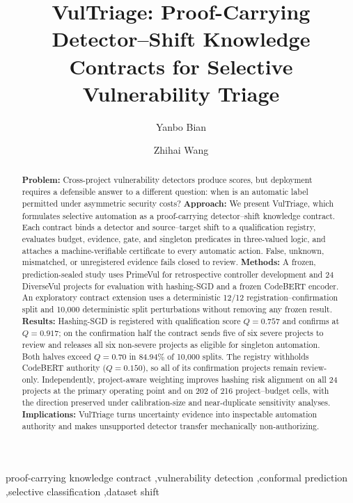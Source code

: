 \documentclass[preprint,12pt]{elsarticle}
\def\corref#1{}%
\def\cortext[#1]#2{}%
\def\ead#1{}%
\def\address[#1]#2{}%
\newcommand{\method}{VulTriage\xspace}
\begin{document}
\begin{frontmatter}

\title{VulTriage: Proof-Carrying Detector--Shift Knowledge Contracts for Selective Vulnerability Triage}

\author[inst1]{Yanbo Bian\corref{cor1}}
\ead{24722081@bjtu.edu.cn}
\author[inst2]{Zhihai Wang}
\ead{zhhwang@bjtu.edu.cn}
\cortext[cor1]{Corresponding author: Yanbo Bian.}
\address[inst1]{Computer Science and Technology Program, Weihai International College, Beijing Jiaotong University, Weihai 264401, China}
\address[inst2]{School of Computer Science and Technology, Beijing Jiaotong University, Beijing 100044, China}

\begin{abstract}
\textbf{Problem:} Cross-project vulnerability detectors produce scores, but deployment requires a defensible answer to a different question: when is an automatic label permitted under asymmetric security costs? \textbf{Approach:} We present \method, which formulates selective automation as a proof-carrying detector--shift knowledge contract. Each contract binds a detector and source--target shift to a qualification registry, evaluates budget, evidence, gate, and singleton predicates in three-valued logic, and attaches a machine-verifiable certificate to every automatic action. False, unknown, mismatched, or unregistered evidence fails closed to review. \textbf{Methods:} A frozen, prediction-sealed study uses PrimeVul for retrospective controller development and 24 DiverseVul projects for evaluation with hashing-SGD and a frozen CodeBERT encoder. An exploratory contract extension uses a deterministic 12/12 registration--confirmation split and 10,000 deterministic split perturbations without removing any frozen result. \textbf{Results:} Hashing-SGD is registered with qualification score $Q=0.757$ and confirms at $Q=0.917$; on the confirmation half the contract sends five of six severe projects to review and releases all six non-severe projects as eligible for singleton automation. Both halves exceed $Q=0.70$ in 84.94\% of 10,000 splits. The registry withholds CodeBERT authority ($Q=0.150$), so all of its confirmation projects remain review-only. Independently, project-aware weighting improves hashing risk alignment on all 24 projects at the primary operating point and on 202 of 216 project--budget cells, with the direction preserved under calibration-size and near-duplicate sensitivity analyses. \textbf{Implications:} \method turns uncertainty evidence into inspectable automation authority and makes unsupported detector transfer mechanically non-authorizing.
\end{abstract}

\begin{keyword}
  proof-carrying knowledge contract \sep vulnerability detection \sep conformal prediction \sep selective classification \sep dataset shift
\end{keyword}
\end{frontmatter}
\end{document}
